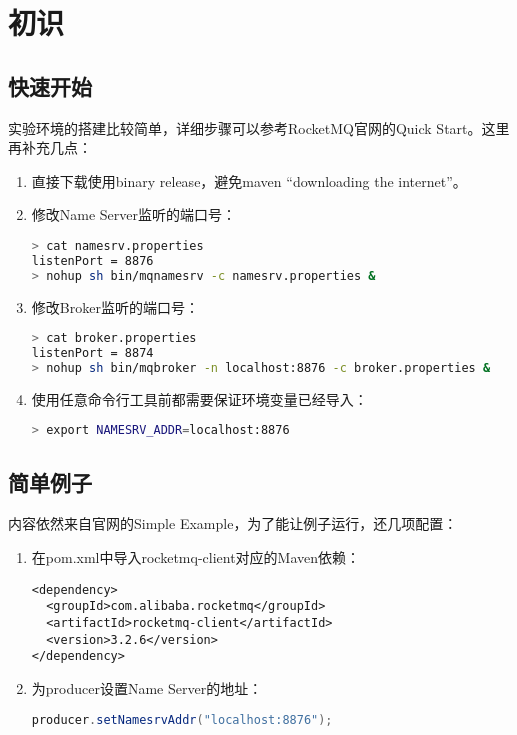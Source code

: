 \section{初识}
\subsection{快速开始}

实验环境的搭建比较简单，详细步骤可以参考RocketMQ官网的Quick Start\cite{quick-start}。这里再补充几点：

\begin{enumerate}[itemindent=1em]
\item 直接下载使用binary release，避免maven “downloading the internet”。

\item 修改Name Server监听的端口号：
\begin{lstlisting}[language=sh, style=customStyleBashDark]
> cat namesrv.properties
listenPort = 8876
> nohup sh bin/mqnamesrv -c namesrv.properties &
\end{lstlisting}
\item 修改Broker监听的端口号：
\begin{lstlisting}[language=sh, style=customStyleBashDark]
> cat broker.properties
listenPort = 8874
> nohup sh bin/mqbroker -n localhost:8876 -c broker.properties &
\end{lstlisting}

\item 使用任意命令行工具前都需要保证环境变量已经导入：
\begin{lstlisting}[language=sh, style=customStyleBashDark]
> export NAMESRV_ADDR=localhost:8876
\end{lstlisting}

\end{enumerate} 



\subsection{简单例子}
内容依然来自官网的Simple Example\cite{simple-example}，为了能让例子运行，还几项配置：

\begin{enumerate}[itemindent=1em]

\item 在pom.xml中导入rocketmq-client对应的Maven依赖：
\begin{lstlisting}[style=customStyleHTMLDark]
<dependency>
  <groupId>com.alibaba.rocketmq</groupId>
  <artifactId>rocketmq-client</artifactId>
  <version>3.2.6</version>
</dependency>
\end{lstlisting}


\item 为producer设置Name Server的地址：
\begin{lstlisting}[language=Java, style=customStyleJavaDark]
producer.setNamesrvAddr("localhost:8876");
\end{lstlisting}

\end{enumerate} 


